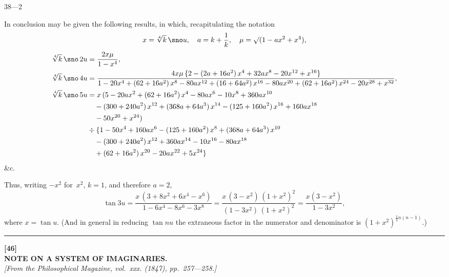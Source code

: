 \documentclass[11pt,a4paper]{book}
\begin{document}
\begin{center}
38---2
\end{center}

\newpage
In conclusion may be given the following results, in which, recapitulating the notation
\[
x = \sqrt[4]{k}\,\sno u, \quad a = k + \frac{1}{k}, \quad \mu = \surd(1 - ax^2 + x^4),
\]
\begin{align*}
\sqrt[4]{k}\,\sno\,2u &= \frac{2x\mu}{1-x^4},\\
\sqrt[4]{k}\,\sno\,4u &= \frac{4x\mu\,\{2 - (2a+16a^2)\,x^4 + 32ax^8 - 20x^{12} + x^{16}\}}{1 - 20x^4 + (62+16a^2)\,x^8 - 80ax^{12} + (16+64a^2)\,x^{16} - 80ax^{20} + (62+16a^2)\,x^{24} - 20x^{28} + x^{32}},\\
\sqrt[4]{k}\,\sno\,5u &= x\,(5 - 20ax^2 + (62+16a^2)\,x^4 - 80ax^6 - 10x^8 + 360ax^{10} \\
  &\quad- (300+240a^2)\,x^{12} + (368a+64a^3)\,x^{14} - (125+160a^2)\,x^{16} + 160ax^{18} \\
  &\quad- 50x^{20} + x^{24}) \\
  &\div\{1 - 50x^4 + 160ax^6 - (125+160a^2)\,x^8 + (368a+64a^3)\,x^{10} \\
  &\quad- (300+240a^2)\,x^{12} + 360ax^{14} - 10x^{16} - 80ax^{18} \\
  &\quad+ (62+16a^2)\,x^{20} - 20ax^{22} + 5x^{24}\}
\end{align*}
\&c.

Thus, writing $-x^2$ for~$x^2$, $k=1$, and therefore $a=2$,
\[
\tan 3u = \frac{x\,(3+8x^2+6x^4-x^6)}{1-6x^4-8x^6-3x^8} = \frac{x\,(3-x^2)\,(1+x^2)^2}{(1-3x^2)\,(1+x^2)^2} = \frac{x(3-x^2)}{1-3x^2},
\]
where $x = \tan u$. (And in general in reducing $\tan nu$ the extraneous factor in the numerator and denominator is $(1+x^2)^{\frac{1}{2}n(n-1)}$.)

\vspace{20pt}
\begin{center}
\rule{0.5\textwidth}{0.4pt}
\end{center}


\newpage
{}
\begin{center}
\textbf{[46]}\\[4pt]
\textbf{\large NOTE ON A SYSTEM OF IMAGINARIES.}\\[4pt]
\textit{[From the Philosophical Magazine, vol.~xxx. (1847), pp.~257---258.]}
\end{center}
\end{document}
